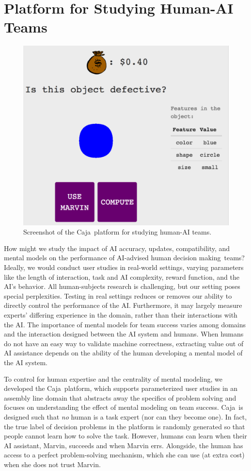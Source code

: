 \documentclass[letterpaper]{article}
\newcommand{\name}{AI-advised human decision making}
\newcommand{\plat}{{\sc Caja}}
\begin{document}
\section{Platform for Studying Human-AI Teams}
\begin{figure}[t]
    \centering
    \includegraphics[width=0.8\linewidth]{tutorial-1.png}
    \caption{Screenshot of the \plat\ platform for studying human-AI teams.}
    \label{fig:ui}
\end{figure}  

How might we study the impact of AI accuracy, updates, compatibility, and mental models on the performance of \name\ teams? Ideally, we would conduct user studies in real-world settings, varying parameters like the length of interaction, task and AI complexity, reward function, and the AI's behavior. All human-subjects research is challenging, but our setting poses special perplexities. Testing in real settings reduces or removes our ability to directly control the performance of the AI. Furthermore, it may largely measure experts' differing experience in the domain, rather than their interactions with the AI.
The importance of mental models for team success
varies among domains and the interaction designed between the AI system and humans. When humans do not have an easy way to validate machine correctness, extracting value out of AI assistance depends on the ability of the human developing a mental model of the AI system. 

To control for human expertise and the centrality of mental modeling, we developed the \plat\ platform, which supports parameterized user studies in an assembly line domain that abstracts away the specifics of problem solving and focuses on understanding the effect of mental modeling on team success. \plat\ is designed such that {\em no} human is a task expert (nor can they become one). In fact, the true label of decision problems in the platform is randomly generated so that people cannot learn how to solve the task. However, humans can learn when their AI assistant, Marvin, succeeds and when Marvin errs. Alongside, the human has access to a perfect problem-solving mechanism, which she can use (at extra cost) when she does not trust Marvin. 
\end{document}
